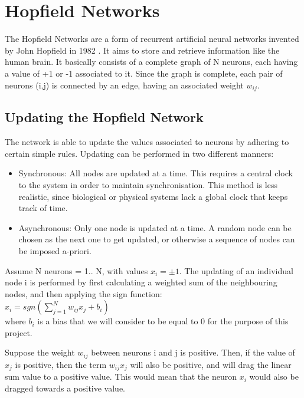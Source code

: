\section{Hopfield Networks}
The Hopfield Networks are a form of recurrent artificial neural networks invented by John Hopfield in 1982 \cite{hopfield_wiki}. It aims to store and retrieve information like the human brain. It basically consists of a complete graph of N neurons, each having a value of +1 or -1 associated to it. Since the graph is complete, each pair of neurons (i,j) is connected by an edge, having an associated weight \( w_{ij}\). 

\subsection{Updating the Hopfield Network}

The network is able to update the values associated to neurons by adhering to certain simple rules. Updating can be performed in two different manners:
\begin{itemize}
 \item Synchronous: All nodes are updated at a time. This requires a central clock to the system in order to maintain synchronisation. This method is less realistic, since biological or physical systems lack a global clock that keeps track of time. 
 \item Asynchronous: Only one node is updated at a time. A random node can be chosen as the next one to get updated, or otherwise a sequence of nodes can be imposed a-priori.
\end{itemize}

Assume N neurons = 1.. N, with values \(x_{i} = \pm1\). The updating of an individual node i is performed by first calculating a weighted sum of the neighbouring nodes, and then applying the sign function:\\

 \(x_{i} = sgn(\sum_{j=1}^{N}w_{ij}x_{j} + b_{i})\)\\

where \( b_{i} \) is a bias that we will consider to be equal to 0 for the purpose of this project.

Suppose the weight \( w_{ij}\) between neurons i and j is positive. Then, if the value of \( x_{j} \) is positive, then the term \( w_{ij}x_{j} \) will also be positive, and will drag the linear sum value to a positive value. This would mean that the neuron \( x_{i} \) would also be dragged towards a positive value. 

